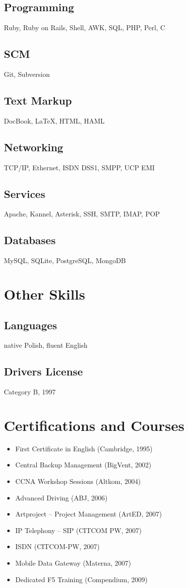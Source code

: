 \documentclass[9pt,a4paper,twocolumn]{extarticle}
\begin{document}
\subsection*{Programming}
Ruby, Ruby on Rails, Shell, AWK, SQL, PHP, Perl, C
\subsection*{SCM}
Git, Subversion
\subsection*{Text Markup}
DocBook, \LaTeX, HTML, HAML
\subsection*{Networking}
TCP/IP, Ethernet, ISDN DSS1, SMPP, UCP EMI
\subsection*{Services}
Apache, Kannel, Asterisk, SSH, SMTP, IMAP, POP
\subsection*{Databases}
MySQL, SQLite, PostgreSQL, MongoDB

\section*{Other Skills}
\subsection*{Languages}
native Polish, fluent English
\subsection*{Drivers License}
Category B, 1997

\section*{Certifications and Courses}

\begin{itemize}
\setlength{\itemsep}{0cm}%
\setlength{\parskip}{0cm}%
\item First Certificate in English (Cambridge, 1995)
\item Central Backup Management (BigVent, 2002)
\item CCNA Workshop Sessions (Altkom, 2004)
\item Advanced Driving (ABJ, 2006)
\item Artproject – Project Management (ArtED, 2007)
\item IP Telephony – SIP (CITCOM PW, 2007)
\item ISDN (CITCOM-PW, 2007)
\item Mobile Data Gateway (Materna, 2007)
\item Dedicated F5 Training (Compendium, 2009)
\end{itemize}
\end{document}
